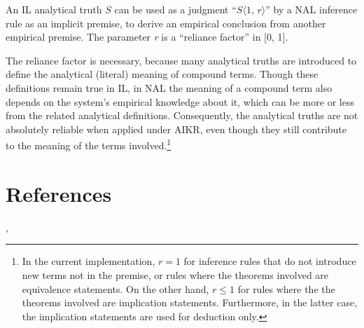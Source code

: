 \begin{theo}
An IL analytical truth $S$ can be used as a judgment ``\(S \langle 1, \, r\rangle\)'' by a NAL inference rule as an implicit premise, to derive an empirical conclusion from another empirical premise. The parameter \emph{r} is a ``reliance factor'' in [0, 1].
\end{theo}

The reliance factor is necessary, because many analytical truths are introduced to define the analytical (literal) meaning of compound terms. Though these definitions remain true in IL, in NAL the meaning of a compound term also depends on the system's empirical knowledge about it, which can be more or less from the related analytical definitions. Consequently, the analytical truths are not absolutely reliable when applied under AIKR, even though they still contribute to the meaning of the terms involved.\footnote{In the current implementation, $r = 1$ for inference rules that do not introduce new terms not in the premise, or rules where the theorems involved are equivalence statements. On the other hand, $r \leq 1$ for rules where the the theorems involved are implication statements. Furthermore, in the latter case, the implication statements are used for deduction only.}

\section*{References}

\cite[Chapter 5]{wp:book1}, \cite{wp:abd,wp:unify}
